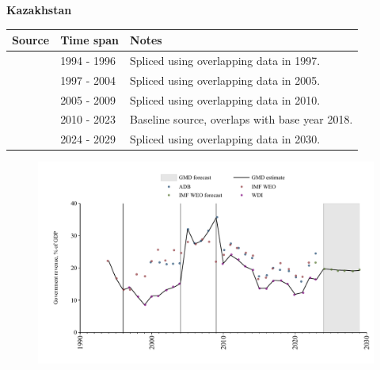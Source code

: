 \documentclass[12pt,a4paper,landscape]{article}
\begin{document}
\begin{adjustbox}{max totalsize={\paperwidth}{\paperheight},center}
\begin{minipage}[t][\textheight][t]{\textwidth}
\vspace*{0.5cm}
{}
\begin{center}
{\Large\bfseries Kazakhstan}
\end{center}
\vspace{0.5cm}
\begin{table}[H]
\centering
\small
\begin{tabular}{|l|l|l|}
\hline
\textbf{Source} & \textbf{Time span} & \textbf{Notes} \\
\hline
\rowcolor{white}\cite{IMF_WEO}& 1994 - 1996 &Spliced using overlapping data in 1997.\\
\rowcolor{lightgray}\cite{WDI}& 1997 - 2004 &Spliced using overlapping data in 2005.\\
\rowcolor{white}\cite{ADB}& 2005 - 2009 &Spliced using overlapping data in 2010.\\
\rowcolor{lightgray}\cite{WDI}& 2010 - 2023 &Baseline source, overlaps with base year 2018.\\
\rowcolor{white}\cite{IMF_WEO_forecast}& 2024 - 2029 &Spliced using overlapping data in 2030.\\
\hline
\end{tabular}
\end{table}
\begin{figure}[H]
\centering
\includegraphics[width=\textwidth,height=0.6\textheight,keepaspectratio]{graphs/KAZ_govrev_GDP.pdf}
\end{figure}
\end{minipage}
\end{adjustbox}
\end{document}
